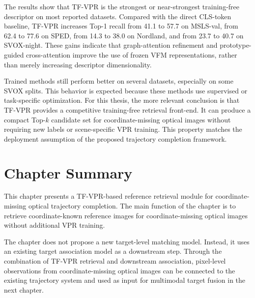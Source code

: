 The results show that TF-VPR is the strongest or near-strongest training-free descriptor on most reported datasets. Compared with the direct CLS-token baseline, TF-VPR increases Top-1 recall from 41.1 to 57.7 on MSLS-val, from 62.4 to 77.6 on SPED, from 14.3 to 38.0 on Nordland, and from 23.7 to 40.7 on SVOX-night. These gains indicate that graph-attention refinement and prototype-guided cross-attention improve the use of frozen VFM representations, rather than merely increasing descriptor dimensionality.

Trained methods still perform better on several datasets, especially on some SVOX splits. This behavior is expected because these methods use supervised or task-specific optimization. For this thesis, the more relevant conclusion is that TF-VPR provides a competitive training-free retrieval front-end. It can produce a compact Top-\(k\) candidate set for coordinate-missing optical images without requiring new labels or scene-specific VPR training. This property matches the deployment assumption of the proposed trajectory completion framework.

\section{Chapter Summary}
This chapter presents a TF-VPR-based reference retrieval module for coordinate-missing optical trajectory completion. The main function of the chapter is to retrieve coordinate-known reference images for coordinate-missing optical images without additional VPR training.

The chapter does not propose a new target-level matching model. Instead, it uses an existing target association model as a downstream step. Through the combination of TF-VPR retrieval and downstream association, pixel-level observations from coordinate-missing optical images can be connected to the existing trajectory system and used as input for multimodal target fusion in the next chapter.
